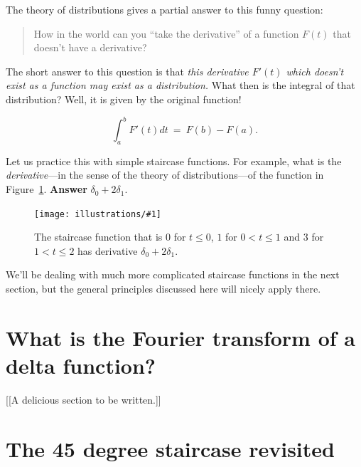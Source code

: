 \documentclass[11pt]{article}
\newcommand{\ill}[3]{ 
   \begin{figure}[H]
   \begin{center}
   \texttt{[image: illustrations/\#1]}
   \caption{#3}
   \end{center}
    \end{figure}
}
\theoremstyle{plain}
\theoremstyle{definition}
\numberwithin{equation}{section}
\numberwithin{figure}{section}
\numberwithin{table}{section}
\begin{document}
The theory of distributions gives a partial answer to this funny question:
     

\begin{quote}  How  in the world can you ``take the derivative'' of a function $F(t)$ that doesn't have a derivative?
\end{quote}

The short answer to this question is that {\it this derivative $F'(t)$ which doesn't exist as a function may exist as a distribution.}  What then is the integral of that distribution? Well, it is given by the original function! 
     
$$\int_a^bF'(t)dt \ = \ F(b) -F(a).$$
     
 Let us practice this with simple staircase functions. For example, what is the {\it derivative}---in the sense of the theory of distributions---of the function in Figure~\ref{fig:simple_staircase}.   {\bf Answer} $\delta_0 + 2 \delta_1$.
     
 
\ill{simple_staircase}{.5}{The staircase function that is $0$ for $t \le 0$, $1$ for $0 <t \le 1$ and $3$ for $1< t \le 2$ has derivative $\delta_0 + 2\delta_1$.\label{fig:simple_staircase}}
     
      
  We'll be dealing with much more complicated staircase functions in the next section, but the general principles discussed here will nicely apply there.



\section{What is the Fourier transform of a delta function?}
[[A delicious section to be written.]]

\section{The 45 degree staircase revisited}
\end{document}
